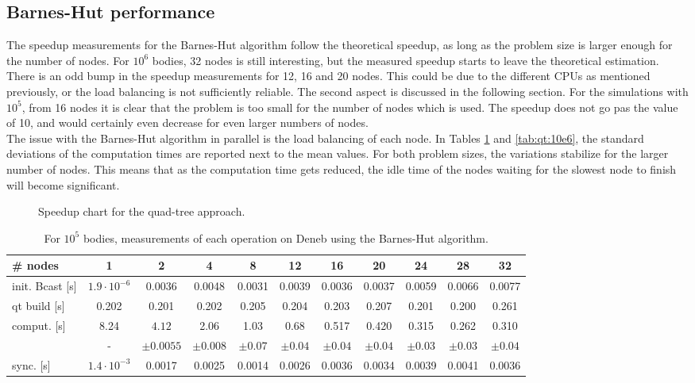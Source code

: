 \subsection{Barnes-Hut performance}
The speedup measurements for the Barnes-Hut algorithm follow the theoretical speedup, as long as the problem size is larger enough for the number of nodes. For $10^6$ bodies, 32 nodes is still interesting, but the measured speedup starts to leave the theoretical estimation. There is an odd bump in the speedup measurements for 12, 16 and 20 nodes. This could be due to the different CPUs as mentioned previously, or the load balancing is not sufficiently reliable. The second aspect is discussed in the following section. For the simulations with $10^5$, from 16 nodes it is clear that the problem is too small for the number of nodes which is used. The speedup does not go pas the value of 10, and would certainly even decrease for even larger numbers of nodes.\\
The issue with the Barnes-Hut algorithm in parallel is the load balancing of each node. In Tables \ref{tab:qt:10e5} and \ref{tab:qt:10e6}, the standard deviations of the computation times are reported next to the mean values. For both problem sizes, the variations stabilize for the larger number of nodes. This means that as the computation time gets reduced, the idle time of the nodes waiting for the slowest node to finish will become significant.
\begin{figure}
\centering

\caption{Speedup chart for the quad-tree approach.}
\end{figure}

\begin{table}
  \begin{adjustwidth}{-1.5cm}{-1.5cm}       
    \centering
    \begin{tabular}{l|cccccccccc}
      \# nodes & 1 & 2 & 4 & 8 & 12 & 16 & 20 & 24 & 28 & 32\\
      \hline init. Bcast [s] & $1.9\cdot10^{-6}$ & 0.0036 & 0.0048 & 0.0031 & 0.0039 & 0.0036 & 0.0037 & 0.0059 & 0.0066 & 0.0077\\
      qt build [s] & 0.202 & 0.201 & 0.202 & 0.205 & 0.204 & 0.203 &0.207 & 0.201 & 0.200 & 0.261\\
      comput. [s] & 8.24 & $4.12$ & 2.06 & 1.03 &  0.68  & 0.517 &0.420 & 0.315 & 0.262 & 0.310\\
      & - & $\pm 0.0055$ & $\pm 0.008$ & $\pm0.07$ & $\pm 0.04$ & $\pm 0.04$ & $\pm0.04$ & $\pm0.03$ & $\pm0.03$ & $\pm 0.04$ \\
      sync. [s] & $1.4\cdot 10^{-3}$ & 0.0017 & 0.0025 & 0.0014 & 0.0026 &  0.0036& 0.0034 & 0.0039 & 0.0041 & 0.0036\\
    \end{tabular}
    \caption{For $10^5$ bodies, measurements of each operation on Deneb using the Barnes-Hut algorithm.}
    \label{tab:qt:10e5}
  \end{adjustwidth}
\end{table}

